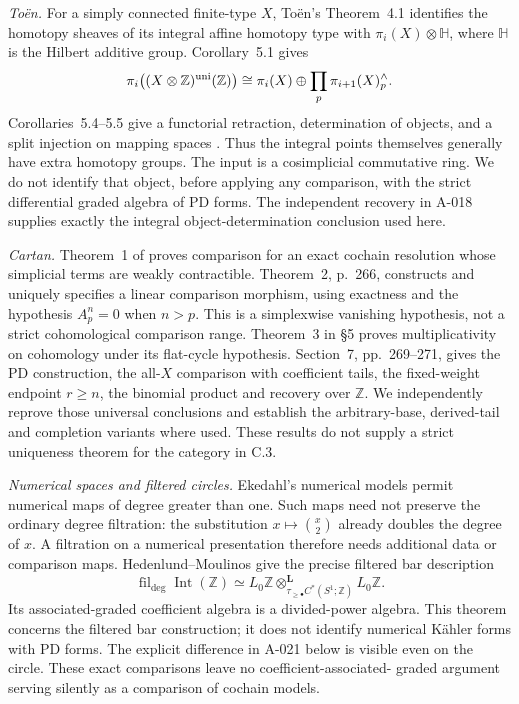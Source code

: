 \emph{To\"en.}
For a simply connected finite-type $X$, To\"en's Theorem~4.1
identifies the homotopy sheaves of its integral affine homotopy
type with $\pi_i(X)\otimes\mathbb H$, where $\mathbb H$ is the
Hilbert additive group. Corollary~5.1 gives
\[
 \pi_i\bigl((X\otimes\mathbb Z)^{\rm uni}(\mathbb Z)\bigr)
 \cong \pi_i(X)\oplus\prod_p\pi_{i+1}(X)^{\wedge}_p.
\]
Corollaries~5.4--5.5 give a functorial retraction, determination of
objects, and a split injection on mapping spaces
\cite{A_Toen2020}. Thus the integral points themselves generally
have extra homotopy groups. The input is a cosimplicial
commutative ring. We do not identify that object, before applying
any comparison, with the strict differential graded algebra of
PD forms. The independent recovery in A-018 supplies exactly the
integral object-determination conclusion used here.

\emph{Cartan.}
Theorem~1 of \cite[\S2, p.~264]{A_Cartan1976} proves comparison
for an exact cochain resolution whose simplicial terms are
weakly contractible. Theorem~2, p.~266, constructs and uniquely
specifies a linear comparison morphism, using exactness and the
hypothesis $A_p^n=0$ when $n>p$. This is a simplexwise vanishing
hypothesis, not a strict cohomological comparison range.
Theorem~3 in \S5 proves multiplicativity on cohomology under its
flat-cycle hypothesis. Section~7, pp.~269--271, gives the PD
construction, the all-$X$ comparison with coefficient tails,
the fixed-weight endpoint $r\geq n$, the binomial product and
recovery over $\mathbb Z$. We independently reprove those
universal conclusions and establish the arbitrary-base,
derived-tail and completion variants where used. These results
do not supply a strict uniqueness theorem for the category in C.3.

\emph{Numerical spaces and filtered circles.}
Ekedahl's numerical models \cite{A_Ekedahl2001} permit numerical
maps of degree greater than one. Such maps need not preserve the
ordinary degree filtration: the substitution $x\mapsto\binom x2$
already doubles the degree of $x$. A filtration on a numerical
presentation therefore needs additional data or comparison maps.
Hedenlund--Moulinos \cite[\S5.2 and Proposition~5.17]{A_HedenlundMoulinos}
give the precise filtered bar description
\[
 \operatorname{fil}_{\deg}\operatorname{Int}(\mathbb Z)
 \simeq L_0\mathbb Z\otimes^{\mathbf L}_
 {\tau_{\geq\bullet}C^*(S^1;\mathbb Z)}L_0\mathbb Z.
\]
Its associated-graded coefficient algebra is a divided-power
algebra. This theorem concerns the filtered bar construction;
it does not identify numerical K\"ahler forms with PD forms.
The explicit difference in A-021 below is visible even on the
circle. These exact comparisons leave no coefficient-associated-
graded argument serving silently as a comparison of cochain
models.

